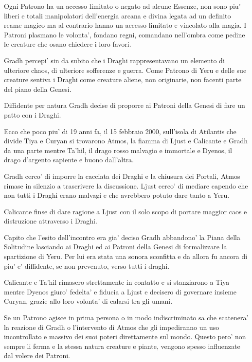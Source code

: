 \documentclass[a4paper,11pt,twoside,openany]{dndbook}
\begin{document}
{Ogni Patrono ha un accesso limitato o negato ad alcune Essenze, non sono piu' liberi e totali manipolatori dell'energia arcana e divina legata ad un definito reame magico ma al contrario hanno un accesso limitato e vincolato alla magia. 
I Patroni plasmano le volonta', fondano regni, comandano nell'ombra come pedine le creature che osano chiedere i loro favori.

Gradh percepi' sin da subito che i Draghi rappresentavano un elemento di ulteriore chaos, di ulteriore sofferenze e guerra. Come Patrono di Yeru e delle sue creature sentiva i Draghi come creature aliene, non originarie, non facenti parte del piano della Genesi.

Diffidente per natura Gradh decise di proporre ai Patroni della Genesi di fare un patto con i Draghi.

Ecco che poco piu' di 19 anni fa, il 15 febbraio 2000, sull'isola di Atilantis che divide Tiya e Curyan si trovarono Atmos, la fiamma di Ljust e Calicante e Gradh da una parte mentre Ta'hil, il drago rosso malvagio e immortale e Dyenos, il drago d'argento sapiente e buono dall'altra.

Gradh cerco' di imporre la cacciata dei Draghi e la chiusura dei Portali, Atmos rimase in silenzio a trascrivere la discussione. Ljust cerco' di mediare capendo che non tutti i Draghi erano malvagi e che avrebbero potuto dare tanto a Yeru.

Calicante finse di dare ragione a Ljust con il solo scopo di portare maggior caos e distruzione attraverso i Draghi.

Capito che l'esito dell'incontro era gia' deciso Gradh abbandono' la Piana della Solitudine lasciando ai Draghi ed ai Patroni della Genesi di formalizzare la spartizione di Yeru. Per lui era stata una sonora sconfitta e da allora fu ancora di piu' e' diffidente, se non prevenuto, verso tutti i draghi.

Calicante e Ta'hil rimasero strettamente in contatto e si stanziarono a Tiya mentre Dyenos giuro' fedelta' e fiducia a Ljust e decisero di governare insieme Curyan, grazie allo loro volonta' di calarsi tra gli umani.

Se un Patrono agisce in prima persona o in modo indiscriminato sa che scatenera' la reazione di Gradh o l'intervento di Atmos che gli impediranno un uso incontrollato e massivo dei suoi poteri direttamente sul mondo. Questo pero' non sempre li ferma e la stessa natura creature e piante, vengono spesso influenzate dal volere dei Patroni.

}
\end{document}
